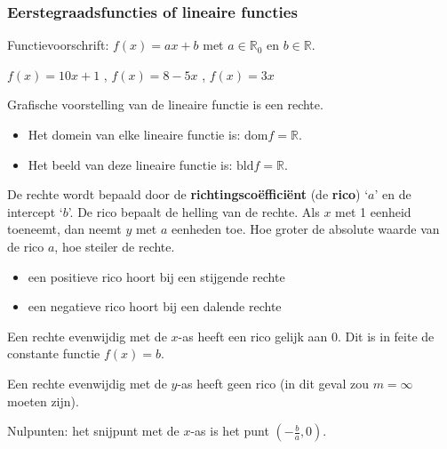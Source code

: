 \subsubsection{Eerstegraadsfuncties of lineaire functies}

\begin{definitie}
	Functievoorschrift: $f(x)=ax+b$ met $a\in\mathbb{R}_{0}$
en $b\in\mathbb{R}$.

\end{definitie}


\begin{voorbeeld}
	 $f(x)=10x+1$ , $f(x)=8-5x$ , $f(x)=3x$
\end{voorbeeld}

Grafische voorstelling van de lineaire functie is een rechte.


\begin{itemize}
	\item Het domein van elke lineaire functie is: $\textrm{dom} f = \mathbb{R}$.
	\item Het beeld van deze lineaire functie is: $\textrm{bld} f = \mathbb{R}$.
\end{itemize}

De rechte wordt bepaald door de \textbf{richtingsco\"effici\"ent}
(de \textbf{rico}) \textquoteleft $a$\textquoteright{} en de intercept
\textquoteleft $b$\textquoteright . De rico bepaalt de helling van
de rechte. Als $x$ met 1 eenheid toeneemt, dan neemt $y$ met $a$
eenheden toe. Hoe groter de absolute waarde van de rico $a$, hoe
steiler de rechte.
\begin{itemize}
\item een positieve rico hoort bij een stijgende rechte
\item een negatieve rico hoort bij een dalende rechte
\end{itemize}


Een rechte evenwijdig met de $x$-as heeft een rico gelijk
aan 0. Dit is in feite de constante functie $f(x)=b$.

Een rechte evenwijdig met de $y$-as heeft geen rico (in
dit geval zou $m=\infty$ moeten zijn). 

Nulpunten: het snijpunt met de $x$-as is het
punt $(-\frac{b}{a},0)$.

%

